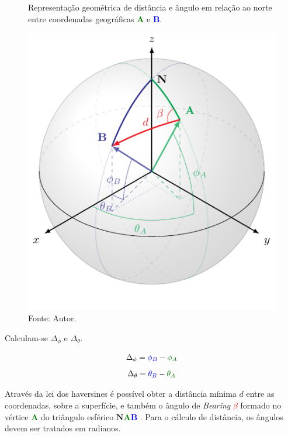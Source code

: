 \begin{figure}[htbp]
    \centering
    \caption{Representação geométrica de distância e ângulo em relação ao norte entre coordenadas geográficas \textcolor{Green}{$\mathbf{A}$} e \textcolor{Blue}{$\mathbf{B}$}.}
    \includegraphics{../pictures/globo.pdf}
    \caption*{Fonte: Autor.}
    \label{fig:globo}
\end{figure}

Calculam-se $\Delta_\phi$ e $\Delta_\theta$.

    \begin{equation}
        \Delta_\phi = \textcolor{Blue}{\phi_B} - \textcolor{Green}{\phi_A}
    \end{equation}
    \begin{equation}
        \Delta_\theta = \textcolor{Blue}{\theta_B} - \textcolor{Green}{\theta_A}
    \end{equation}

Através da lei dos haversines é possível obter a distância mínima $d$ entre as coordenadas, sobre a superfície, e também o ângulo de \textit{Bearing} \textcolor{Red}{$\beta$} formado no vértice \textcolor{Green}{$\mathbf{A}$} do triângulo esférico $\mathbf{N}$\textcolor{Green}{$\mathbf{A}$}\textcolor{Blue}{$\mathbf{B}$} \cite{chrisveness}.
Para o cálculo de distância, os ângulos devem ser tratados em radianos.

